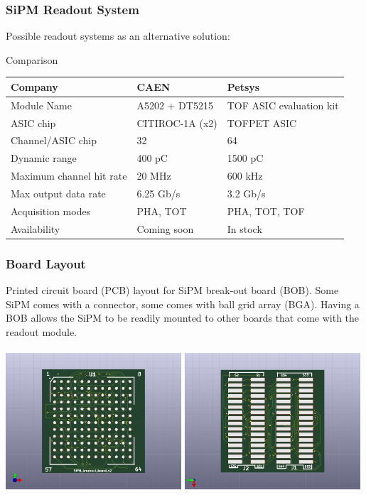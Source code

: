 \documentclass[xcolor=x11names, compress, handout]{beamer}
\renewcommand{\(}{\begin{columns}}
\renewcommand{\)}{\end{columns}}
\newcommand{\<}[1]{\begin{column}{#1}}
\renewcommand{\>}{\end{column}}
\begin{document}
\begin{frame}[c]
\frametitle{SiPM Readout System}
Possible readout systems as an alternative solution: \\

  \begin{block}{Comparison}
  \centering
  \begin{tabular}{@{}l l l}
  \hline
  Company & CAEN & Petsys \\
  \hline
  Module Name & A5202 + DT5215 & TOF ASIC evaluation kit \\
  ASIC chip & CITIROC-1A (x2) & TOFPET ASIC \\
  Channel/ASIC chip & 32 & 64 \\
  Dynamic range & 400 pC & 1500 pC \\
  Maximum channel hit rate & 20 MHz & 600 kHz  \\
  Max output data rate & 6.25 Gb/s & 3.2 Gb/s \\
  Acquisition modes & PHA, TOT & PHA, TOT, TOF \\
  Availability & Coming soon & In stock \\
  \hline
  \end{tabular}
  \end{block}
\end{frame}

\begin{frame}
\frametitle{Board Layout}
 \scriptsize Printed circuit board (PCB) layout for SiPM break-out board (BOB). Some SiPM comes with a connector, some comes with ball grid array (BGA). Having a BOB allows the SiPM to be readily mounted to other boards that come with the readout module. \\
\ \\
  \includegraphics[width=0.49\textwidth]{images/pcb_sipm_front.png}
  \includegraphics[width=0.49\textwidth]{images/pcb_sipm_back.png}
\end{frame}
\end{document}

